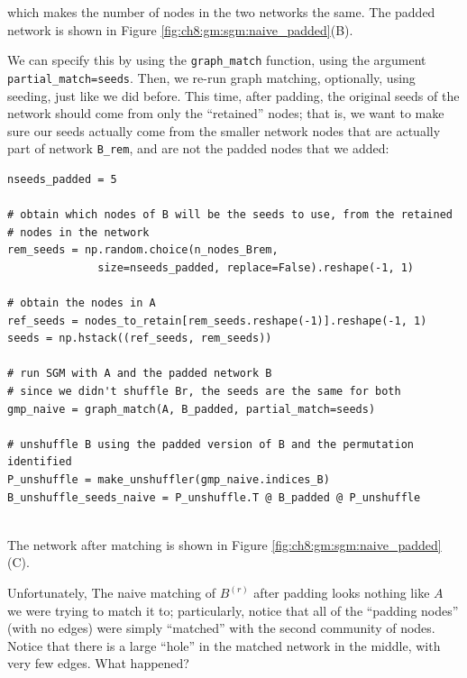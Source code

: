 which makes the number of nodes in the two networks the same. The padded network is shown in Figure \ref{fig:ch8:gm:sgm:naive_padded}(B).

We can specify this by using the \texttt{graph\_match} function, using the argument \texttt{partial\_match=seeds}. Then, we re-run graph matching, optionally, using seeding, just like we did before. This time, after padding, the original seeds of the network should come from only the ``retained'' nodes; that is, we want to make sure our seeds actually come from the smaller network nodes that are actually part of network \texttt{B\_rem}, and are not the padded nodes that we added:

\begin{lstlisting}[style=python]
nseeds_padded = 5

# obtain which nodes of B will be the seeds to use, from the retained
# nodes in the network
rem_seeds = np.random.choice(n_nodes_Brem, 
              size=nseeds_padded, replace=False).reshape(-1, 1)

# obtain the nodes in A
ref_seeds = nodes_to_retain[rem_seeds.reshape(-1)].reshape(-1, 1)
seeds = np.hstack((ref_seeds, rem_seeds))

# run SGM with A and the padded network B
# since we didn't shuffle Br, the seeds are the same for both
gmp_naive = graph_match(A, B_padded, partial_match=seeds)

# unshuffle B using the padded version of B and the permutation identified
P_unshuffle = make_unshuffler(gmp_naive.indices_B)
B_unshuffle_seeds_naive = P_unshuffle.T @ B_padded @ P_unshuffle


\end{lstlisting}

The network after matching is shown in Figure \ref{fig:ch8:gm:sgm:naive_padded}(C). 

Unfortunately, The naive matching of $B^{(r)}$ after padding looks nothing like $A$ we were trying to match it to; particularly, notice that all of the ``padding nodes'' (with no edges) were simply ``matched'' with the second community of nodes. Notice that there is a large ``hole'' in the matched network in the middle, with very few edges. What happened?

